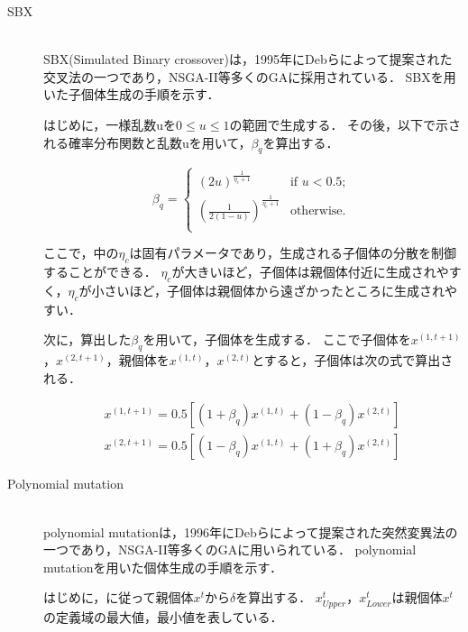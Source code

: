\documentclass[../main/main]{subfiles}
\begin{document}
\clearpage

\begin{description}

\item[SBX]\mbox{}\\
SBX(Simulated Binary crossover)\cite{Agrawal1995simulated}は，1995年にDebらによって提案された交叉法の一つであり，NSGA-II等多くのGAに採用されている．
SBXを用いた子個体生成の手順を示す．

はじめに，一様乱数uを$0 \leq u \leq 1$の範囲で生成する．
その後，以下で示される確率分布関数と乱数uを用いて，$\beta_q$を算出する．

\begin{equation}
\beta_q=\begin{cases}
(2u)^{\frac {1}{\eta_c+1}} & \text{if \ $u<0.5;$} \\
(\frac {1}{2(1-u)})^{\frac {1}{\eta_c+1}} & \text{otherwise.} \\
\end{cases}
\label{beta}
\end{equation}

ここで，中の$\eta_c$は固有パラメータであり，生成される子個体の分散を制御することができる．
$\eta_c$が大きいほど，子個体は親個体付近に生成されやすく，$\eta_c$が小さいほど，子個体は親個体から遠ざかったところに生成されやすい．

次に，算出した$\beta_q$を用いて，子個体を生成する．
ここで子個体を$x^{(1,t+1)}$，$x^{(2,t+1)}$，親個体を$x^{(1,t)}$，$x^{(2,t)}$とすると，子個体は次の式で算出される．

\begin{subequations}
\begin{align}
x^{(1,t+1)}=0.5[(1+\beta_q)x^{(1,t)}+(1-\beta_q)x^{(2,t)}]\\
x^{(2,t+1)}=0.5[(1-\beta_q)x^{(1,t)}+(1+\beta_q)x^{(2,t)}]
\end{align}
\end{subequations}

\item[Polynomial mutation]\mbox{}\\
polynomial mutation\cite{Deb1996combined}は，1996年にDebらによって提案された突然変異法の一つであり，NSGA-II等多くのGAに用いられている．
polynomial mutationを用いた個体生成の手順を示す．

はじめに，に従って親個体$x^t$から$\delta$を算出する．
$x^t_{Upper}$，$x^t_{Lower}$は親個体$x^t$の定義域の最大値，最小値を表している．


\end{description}
\end{document}

